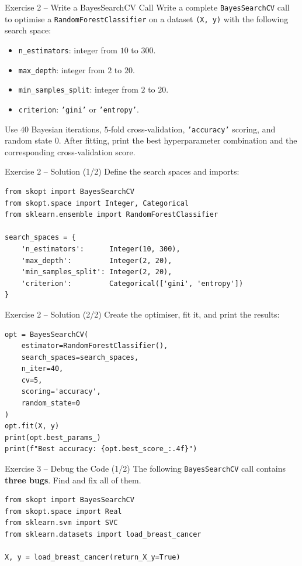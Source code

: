 \documentclass{beamer}
\begin{document}
\begin{frame}{Exercise 2 -- Write a BayesSearchCV Call}
  Write a complete \texttt{BayesSearchCV} call to optimise a \texttt{RandomForestClassifier} on a dataset \texttt{(X, y)} with the following search space:
  \begin{itemize}
    \item \texttt{n\_estimators}: integer from \(10\) to \(300.\)
    \item \texttt{max\_depth}: integer from \(2\) to \(20.\)
    \item \texttt{min\_samples\_split}: integer from \(2\) to \(20.\)
    \item \texttt{criterion}: \texttt{'gini'} or \texttt{'entropy'}.
  \end{itemize}
  Use \(40\) Bayesian iterations, \(5\)-fold cross-validation, \texttt{'accuracy'} scoring, and random state \(0.\)
  After fitting, print the best hyperparameter combination and the corresponding cross-validation score.
\end{frame}

\begin{frame}[fragile]{Exercise 2 -- Solution (1/2)}
  Define the search spaces and imports:
  \begin{lstlisting}
from skopt import BayesSearchCV
from skopt.space import Integer, Categorical
from sklearn.ensemble import RandomForestClassifier

search_spaces = {
    'n_estimators':      Integer(10, 300),
    'max_depth':         Integer(2, 20),
    'min_samples_split': Integer(2, 20),
    'criterion':         Categorical(['gini', 'entropy'])
}
  \end{lstlisting}
\end{frame}

\begin{frame}[fragile]{Exercise 2 -- Solution (2/2)}
  Create the optimiser, fit it, and print the results:
  \begin{lstlisting}
opt = BayesSearchCV(
    estimator=RandomForestClassifier(),
    search_spaces=search_spaces,
    n_iter=40,
    cv=5,
    scoring='accuracy',
    random_state=0
)
opt.fit(X, y)
print(opt.best_params_)
print(f"Best accuracy: {opt.best_score_:.4f}")
  \end{lstlisting}
\end{frame}

\begin{frame}[fragile]{Exercise 3 -- Debug the Code (1/2)}
  The following \texttt{BayesSearchCV} call contains \textbf{three bugs}.
  Find and fix all of them.
  \begin{lstlisting}
from skopt import BayesSearchCV
from skopt.space import Real
from sklearn.svm import SVC
from sklearn.datasets import load_breast_cancer

X, y = load_breast_cancer(return_X_y=True)
  \end{lstlisting}
\end{frame}
\end{document}
